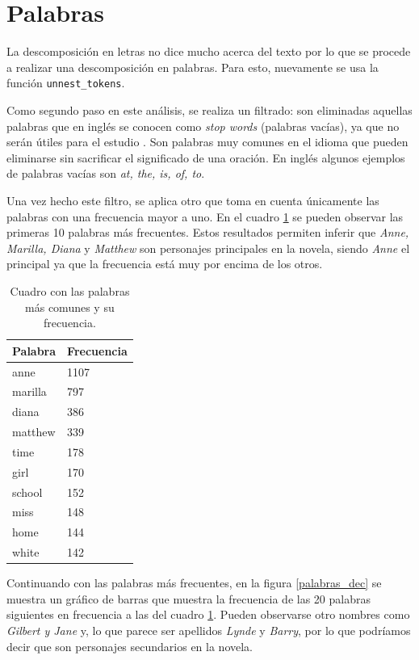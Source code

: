 \documentclass[12pt]{article}
\begin{document}
	\section{Palabras}
	
	La descomposición en letras no dice mucho acerca del texto por lo que se procede a realizar una descomposición en palabras. Para esto, nuevamente se usa la función \texttt{unnest\_tokens}.
	
	Como segundo paso en este análisis, se realiza un filtrado: son eliminadas aquellas palabras que en inglés se conocen como \textit{stop words} (palabras vacías), ya que no serán útiles para el estudio \cite{textMining}. Son palabras muy comunes en el idioma que pueden eliminarse sin sacrificar el significado de una oración. En inglés algunos ejemplos de palabras vacías son \textit{at, the, is, of, to}.
	
	Una vez hecho este filtro, se aplica otro que toma en cuenta únicamente las palabras con una frecuencia mayor a uno. En el cuadro \ref{frecuencia_palabras} se pueden observar las primeras 10 palabras más frecuentes. Estos resultados permiten inferir que \textit{Anne, Marilla, Diana} y \textit{Matthew} son personajes principales en la novela, siendo \textit{Anne} el principal ya que la frecuencia está muy por encima de los otros.
	
	\begin{table}
		\centering
		\caption{Cuadro con las palabras más comunes y su frecuencia.}
		\label{frecuencia_palabras}
		\begin{tabular}{l|l}
			\hline
			Palabra & Frecuencia \\
			\hline
			anne & 1107\\
			marilla & 797\\
			diana & 386\\
			matthew & 339\\
			time & 178\\
			girl & 170\\
			school & 152\\
			miss & 148\\
			home & 144\\
			white & 142\\
			\hline
		\end{tabular}
	\end{table}

	Continuando con las palabras más frecuentes, en la figura \ref{palabras_dec} se muestra un gráfico de barras que muestra la frecuencia de las 20 palabras siguientes en frecuencia a las del cuadro \ref{frecuencia_palabras}. Pueden observarse otro nombres como \textit{Gilbert y Jane} y, lo que parece ser apellidos \textit{Lynde} y \textit{Barry}, por lo que podríamos decir que son personajes secundarios en la novela. 
	
\end{document}
